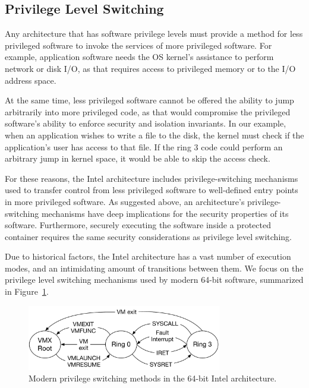 \subsection{Privilege Level Switching}
\label{sec:privilege_switches}

Any architecture that has software privilege levels must provide a method for
less privileged software to invoke the services of more privileged software.
For example, application software needs the OS kernel's assistance to
perform network or disk I/O, as that requires access to privileged memory or
to the I/O address space.

At the same time, less privileged software cannot be offered the ability to
jump arbitrarily into more privileged code, as that would compromise the
privileged software's ability to enforce security and isolation invariants. In
our example, when an application wishes to write a file to the disk, the kernel
must check if the application's user has access to that file. If the ring 3
code could perform an arbitrary jump in kernel space, it would be able to skip
the access check.

For these reasons, the Intel architecture includes privilege-switching
mechanisms used to transfer control from less privileged software to
well-defined entry points in more privileged software. As suggested above, an
architecture's privilege-switching mechanisms have deep implications for the
security properties of its software. Furthermore, securely executing the
software inside a protected container requires the same security considerations
as privilege level switching.

Due to historical factors, the Intel architecture has a vast number of
execution modes, and an intimidating amount of transitions between them. We
focus on the privilege level switching mechanisms used by modern 64-bit
software, summarized in Figure~\ref{fig:cpu_ring_switch}.

\begin{figure}[hbt]
  \center
  \includegraphics[width=85mm]{figures/cpu_ring_switch.pdf}
  \caption{
    Modern privilege switching methods in the 64-bit Intel architecture.
  }
  \label{fig:cpu_ring_switch}
\end{figure}


